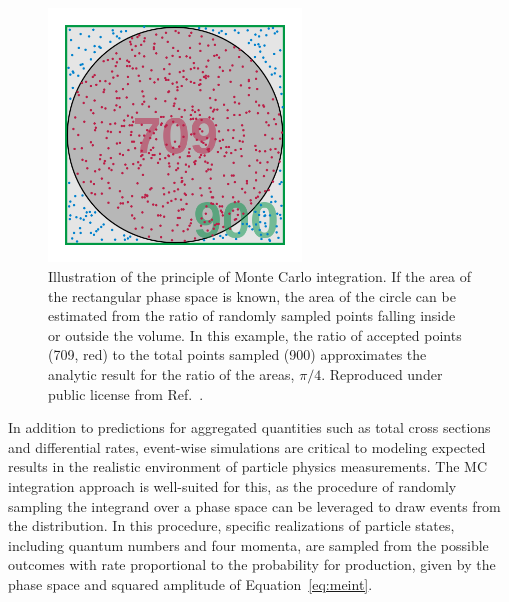 \begin{figure}[htbp]
  \centering
   \includegraphics[width=0.6\textwidth]{figures/Simulation/MCintegration.png}
  \caption[Illustration of the principle of Monte Carlo integration.]{
    Illustration of the principle of Monte Carlo integration. If the area
    of the rectangular phase space is known, the area of the circle can
    be estimated from the ratio of randomly sampled points falling
    inside or outside the volume. In this example, the ratio of accepted
    points (709, red) to the total points sampled (900) approximates the
    analytic result for the ratio of the areas, $\pi/4$.
    Reproduced under public license from Ref.~\cite{wiki:mc}.
        }
 \label{fig:mcintegration}
\end{figure}

In addition to predictions for aggregated quantities such as total cross sections
and differential rates, event-wise simulations are critical to modeling expected 
results in the realistic environment of particle physics measurements.
The MC integration approach is well-suited for this, as the procedure of randomly
sampling the integrand over a phase space can be leveraged to draw events from
the distribution. In this procedure, specific realizations of particle states,
including quantum numbers and four momenta, are sampled from
the possible outcomes with rate proportional to the probability for production,
given by the phase space and squared amplitude of Equation~\ref{eq:meint}.

